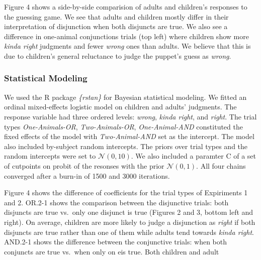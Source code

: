 \documentclass[10pt, letterpaper]{article}
\begin{document}
Figure 4 shows a side-by-side comparision of adults and children's
responses to the guessing game. We see that adults and children mostly
differ in their interpretation of disjunction when both disjuncts are
true. We also see a difference in one-animal conjunctions trials (top
left) where children show more \emph{kinda right} judgments and fewer
\emph{wrong} ones than adults. We believe that this is due to children's
general reluctance to judge the puppet's guess as \emph{wrong}.

\subsubsection{Statistical Modeling}\label{statistical-modeling}

We used the R package \emph{\{rstan\}} for Bayesian statistical
modeling. We fitted an ordinal mixed-effects logistic model on children
and adults' judgments. The response variable had three ordered levels:
\emph{wrong}, \emph{kinda right}, and \emph{right}. The trial types
\emph{One-Animals-OR}, \emph{Two-Animals-OR}, \emph{One-Animal-AND}
constituted the fixed effects of the model with \emph{Two-Animal-AND}
set as the intercept. The model also included by-subject random
intercepts. The priors over trial types and the random intercepts were
set to \(\mathcal{N}(0,10)\). We also included a paramter C of a set of
cutpoints on probit of the resonses with the prior \(\mathcal{N}(0,1)\).
All four chains converged after a burn-in of 1500 and 3000 iterations.

Figure 4 shows the difference of coefficients for the trial types of
Expiriments 1 and 2. OR.2-1 shows the comparison between the disjunctive
trials: both disjuncts are true vs.~only one disjunct is true (Figures 2
and 3, bottom left and right). On average, children are more likely to
judge a disjunction as \emph{right} if both disjuncts are true rather
than one of them while adults tend towards \emph{kinda right}. AND.2-1
shows the difference between the conjunctive trials: when both conjuncts
are true vs.~when only on eis true. Both children and adult
\end{document}
